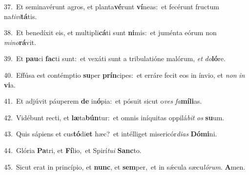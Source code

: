 {\numbfont\textcolor{\numbcolor}{37.}}~Et seminavérunt agros, et planta\-\textbf{vé}\-runt \textbf{ví}\-neas:~\star et fecérunt fructum na\-\textit{ti}\-\textit{vi}\textbf{tá}tis.\par
{\numbfont\textcolor{\numbcolor}{38.}}~Et benedíxit eis, et multipli\-\textbf{cá}\-ti sunt \textbf{ni}\-mis:~\star et juménta eórum non \textit{mi}\-\textit{no}\textbf{rá}vit.\par
{\numbfont\textcolor{\numbcolor}{39.}}~Et \textbf{pau}\-ci \textbf{fac}\-ti sunt:~\star et vexáti sunt a tribulatióne malórum, \textit{et} \textit{do}\-\textbf{ló}re.\par
{\numbfont\textcolor{\numbcolor}{40.}}~Effúsa est contémptio \textbf{su}\-per \textbf{prín}\-cipes:~\star et erráre fecit eos in ínvio, et \textit{non} \textit{in} \textbf{vi}\-a.\par
{\numbfont\textcolor{\numbcolor}{41.}}~Et adjúvit páuperem \textbf{de} in\-\textbf{ó}\-pia:~\star et pósuit sicut o\textit{ves} \textit{fa}\-\textbf{mí}\textbf{li}as.\par
{\numbfont\textcolor{\numbcolor}{42.}}~Vidébunt recti, et \textbf{læ}\-ta\-\textbf{bún}\-tur:~\star et omnis iníquitas oppilá\textit{bit} \textit{os} \textbf{su}\-um.\par
{\numbfont\textcolor{\numbcolor}{43.}}~Quis sápiens et cus\-\textbf{tó}\-di\textbf{et} hæc?~\star et intélliget misericór\-\textit{di}\-\textit{as} \textbf{Dó}\-\textbf{mi}ni.\par
{\numbfont\textcolor{\numbcolor}{44.}}~Glória \textbf{Pa}\-tri, et \textbf{Fí}\-lio,~\star et Spirí\-\textit{tu}\-\textit{i} \textbf{Sanc}\-to.\par
{\numbfont\textcolor{\numbcolor}{45.}}~Sicut erat in princípio, et \textbf{nunc}\-, et \textbf{sem}\-per,~\star et in sǽcula sæcu\-\textit{ló}\-\textit{rum}. \textbf{A}\-men.\par
